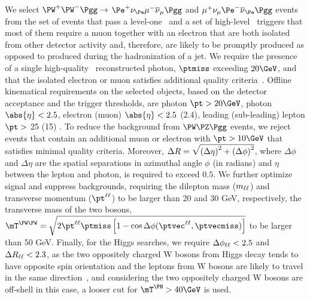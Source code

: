 We select $\PW^+\PW^-\Pgg\to$ $\Pe^+\nu_{\Pe}\mu^-\overline{\nu}_{\mu}\Pgg$ and $\mu^+\nu_{\mu}\Pe^-\overline{\nu}_{\Pe}\Pgg$ events from the set of events that pass a level-one~\cite{Sirunyan:2020zal} and a set of  high-level~\cite{Khachatryan:2016bia} triggers that most of them require a muon together with an electron that are both isolated from other detector activity and, therefore, are likely to be promptly produced as opposed to produced during the hadronization of a jet. We require the presence of a single high-quality~\cite{CMS:EGM-14-001} reconstructed photon, $\ptmiss$ exceeding $20\GeV$, and that the isolated electron or muon satisfies additional quality criteria~\cite{Sirunyan:2018,Khachatryan:2015hwa}. Offline kinematical requirements on the selected objects, based on the detector acceptance and the trigger thresholds, are photon $\pt > 20\GeV$, photon $\abs{\eta} < 2.5$, electron (muon) $\abs{\eta}< 2.5$ (2.4), leading (sub-leading) lepton $\pt > $ 25 (15) \GeV. To reduce the background from $\PW\PZ\Pgg$ events, we reject events that contain an additional muon or electron with $\pt > 10\GeV$ that satisfies minimal quality criteria. Moreover, $\Delta R = \sqrt{\smash[b]{\left(\Delta\eta\right)^2 + \left(\Delta\phi\right)^2}}$, where $\Delta \phi$ and $\Delta \eta$ are the spatial separations in azimuthal angle $\phi$ (in radians) and $\eta$ between the lepton and photon, is required to exceed $0.5$. We further optimize signal and suppress backgrounds, requiring the dilepton mass ($m_{\ell\ell}$) and transverse momentum ($\ptll$) to be larger than 20 and 30 GeV, respectively, the transverse mass of the two \PW bosons, $\mTWW = \sqrt{2 \ptll \ptmiss \left[1 - \cos\Delta\phi(\ptvecll, \ptvecmiss)\right]}$ to be larger than 50 GeV. Finally, for the Higgs searches, we require $\Delta\phi_{\ell\ell}<2.5$ and $\Delta R_{\ell\ell}<2.3$, as the two oppositely charged W bosons from Higgs decay tends to have opposite spin orientation and the leptons from W bosons are likely to travel in the same direction~\cite{Dittmar:1996ss}, and considering the two oppositely charged W bosons are off-shell in this case, a looser cut for $\mTH > 40\GeV$ is used.

